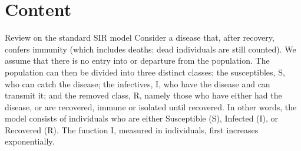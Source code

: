 \documentclass{bmcart}
\begin{document}
\begin{frontmatter}
\begin{abstractbox}
\begin{keyword}
\end{keyword}


\end{abstractbox}
%

\end{frontmatter}



\section*{Content}
Review on the standard SIR model
Consider a disease that, after recovery, confers immunity
(which includes deaths: dead individuals are still
counted). We assume that there is no entry into or departure from the population. The population can then be
divided into three distinct classes; the susceptibles, S, who
can catch the disease; the infectives, I, who have the disease and can transmit it; and the removed class, R, namely
those who have either had the disease, or are recovered,
immune or isolated until recovered. In other words, the model consists of individuals who are either Susceptible (S), Infected (I), or Recovered (R). The function I, measured in individuals, first increases exponentially. 
\end{document}
